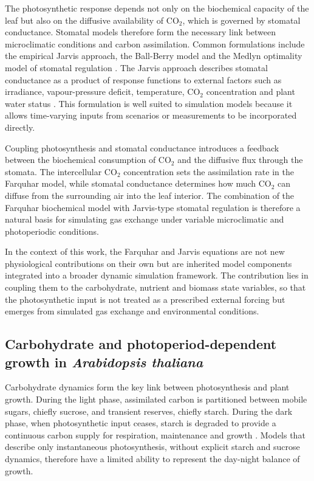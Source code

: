 \documentclass[a4paper,fleqn]{cas-sc}
\begin{document}
The photosynthetic response depends not only on the biochemical capacity of the leaf but also on the diffusive availability of CO$_2$, which is governed by stomatal conductance. Stomatal models therefore form the necessary link between microclimatic conditions and carbon assimilation. Common formulations include the empirical Jarvis approach, the Ball-Berry model and the Medlyn optimality model of stomatal regulation \cite{Jarvis1976,Ball1987,Medlyn2011}. The Jarvis approach describes stomatal conductance as a product of response functions to external factors such as irradiance, vapour-pressure deficit, temperature, CO$_2$ concentration and plant water status \cite{Jarvis1976,YU2017,Yu2021}. This formulation is well suited to simulation models because it allows time-varying inputs from scenarios or measurements to be incorporated directly.

Coupling photosynthesis and stomatal conductance introduces a feedback between the biochemical consumption of CO$_2$ and the diffusive flux through the stomata. The intercellular CO$_2$ concentration sets the assimilation rate in the Farquhar model, while stomatal conductance determines how much CO$_2$ can diffuse from the surrounding air into the leaf interior. The combination of the Farquhar biochemical model with Jarvis-type stomatal regulation is therefore a natural basis for simulating gas exchange under variable microclimatic and photoperiodic conditions.

In the context of this work, the Farquhar and Jarvis equations are not new physiological contributions on their own but are inherited model components integrated into a broader dynamic simulation framework. The contribution lies in coupling them to the carbohydrate, nutrient and biomass state variables, so that the photosynthetic input is not treated as a prescribed external forcing but emerges from simulated gas exchange and environmental conditions.

\subsection{Carbohydrate and photoperiod-dependent growth in \textit{Arabidopsis thaliana}}

Carbohydrate dynamics form the key link between photosynthesis and plant growth. During the light phase, assimilated carbon is partitioned between mobile sugars, chiefly sucrose, and transient reserves, chiefly starch. During the dark phase, when photosynthetic input ceases, starch is degraded to provide a continuous carbon supply for respiration, maintenance and growth \cite{Stitt2012,Smith2007}. Models that describe only instantaneous photosynthesis, without explicit starch and sucrose dynamics, therefore have a limited ability to represent the day-night balance of growth.
\end{document}
